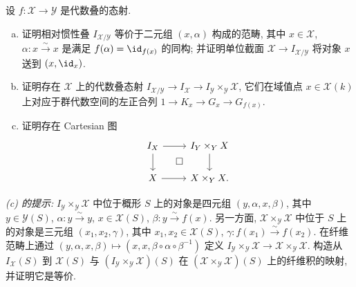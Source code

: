\newpage
\begin{exercise}\label{src:4.2.15}
设 $f:\mathcal X\to\mathcal Y$ 是代数叠的态射.
\begin{enumerate}[(a)]
\item 证明相对惯性叠 $I_{\mathcal X/\mathcal Y}$ 等价于二元组 $(x,\alpha)$ 构成的范畴, 其中 $x\in\mathcal X$, $\alpha:x\xrightarrow{\sim}x$ 是满足 $f(\alpha)=\id_{f(x)}$ 的同构; 并证明单位截面 $\mathcal X\to I_{\mathcal X/\mathcal Y}$ 将对象 $x$ 送到 $(x,\id_x)$.
\item 证明存在 $\mathcal X$ 上的代数叠态射 $I_{\mathcal X/\mathcal Y}\to I_{\mathcal X}\to I_{\mathcal Y}\times_{\mathcal Y}\mathcal X$, 它们在域值点 $x\in\mathcal X(k)$ 上对应于群代数空间的左正合列 $1\to K_x\to G_x\to G_{f(x)}$.
\item 证明存在 Cartesian 图
\[
\begin{tikzcd}
I_{\mathcal X}\arrow[r]\arrow[d]\arrow[dr,phantom,"\square"]&I_{\mathcal Y}\times_{\mathcal Y}\mathcal X\arrow[d]\\
\mathcal X\arrow[r]&\mathcal X\times_{\mathcal Y}\mathcal X.
\end{tikzcd}
\]
\end{enumerate}
\emph{(c) 的提示:} $I_{\mathcal Y}\times_{\mathcal Y}\mathcal X$ 中位于概形 $S$ 上的对象是四元组 $(y,\alpha,x,\beta)$, 其中 $y\in\mathcal Y(S)$, $\alpha:y\xrightarrow{\sim}y$, $x\in\mathcal X(S)$, $\beta:y\xrightarrow{\sim}f(x)$. 另一方面, $\mathcal X\times_{\mathcal Y}\mathcal X$ 中位于 $S$ 上的对象是三元组 $(x_1,x_2,\gamma)$, 其中 $x_1,x_2\in\mathcal X(S)$, $\gamma:f(x_1)\xrightarrow{\sim}f(x_2)$. 在纤维范畴上通过 $(y,\alpha,x,\beta)\mapsto(x,x,\beta\circ\alpha\circ\beta^{-1})$ 定义 $I_{\mathcal Y}\times_{\mathcal Y}\mathcal X\to\mathcal X\times_{\mathcal Y}\mathcal X$. 构造从 $I_{\mathcal X}(S)$ 到 $\mathcal X(S)$ 与 $(I_{\mathcal Y}\times_{\mathcal Y}\mathcal X)(S)$ 在 $(\mathcal X\times_{\mathcal Y}\mathcal X)(S)$ 上的纤维积的映射, 并证明它是等价.
\end{exercise}
